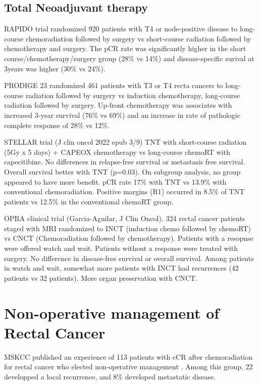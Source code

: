\documentclass[
]{book}
\begin{document}
\hypertarget{total-neoadjuvant-therapy}{%
\subsection{Total Neoadjuvant therapy}\label{total-neoadjuvant-therapy}}

RAPIDO trial randomized 920 patients with T4 or node-positive disease to long-course chemoradiation followed by surgery vs short-course radiation followed by chemotherapy and surgery. The pCR rate was significantly higher in the short course/chemotherapy/surgery group (28\% vs 14\%) and disease-specific surival at 3years was higher (30\% vs 24\%).\citep{bahadoer}

PRODIGE 23 randomized 461 patients with T3 or T4 recta cancers to long-course radiation followed by surgery vs induction chemotherapy, long-course radiation followed by surgery. Up-front chemotherapy was associates with increased 3-year survival (76\% vs 69\%) and an increase in rate of pathologic complete response of 28\% vs 12\%.\citep{conroy702}

STELLAR trial (J clin oncol 2022 epub 3/9) TNT with short-course radiation (5Gy x 5 days) + CAPEOX chemotherapy vs long-course chemoRT with capecitibine. No differences in relapse-free survival or metastasis free survival. Overall survival better with TNT (p=0.03). On subgroup analysis, no group appeared to have more benefit. pCR rate 17\% with TNT vs 13.9\% with conventional chemoradiation. Positive margins (R1) occurred in 8.5\% of TNT patients vs 12.5\% in the conventional chemoRT group.

OPRA clinical trial (Garcia-Aguilar, J Clin Oncol). 324 rectal cancer patients staged with MRI randomized to INCT (induction chemo followed by chemoRT) vs CNCT (Chemoradiation followed by chemotherapy). Patients with a resopnse were offered watch and wait. Patients without a response were treated with surgery. No difference in disease-free survival or overall survival. Among patients in watch and wait, somewhat more patients with INCT had recurrences (42 patients vs 32 patients). More organ preservation with CNCT.

\hypertarget{non-operative-management-of-rectal-cancer}{%
\section{Non-operative management of Rectal Cancer}\label{non-operative-management-of-rectal-cancer}}

MSKCC published an experience of 113 patients with cCR after chemoradiation for rectal cancer who elected non-operative management \citep{smith184896}. Among this group, 22 developped a local recurrence, and 8\% developed metastatic disease.\citep{smith657}
\end{document}
